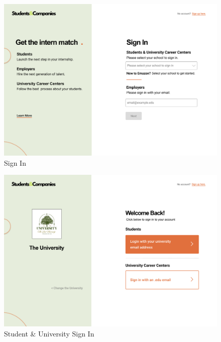 \documentclass{article}
\begin{document}
\begin{figure}[H]
    \centering
    \includegraphics[scale = 0.40]{figures/UserInterfaces/Sign In.png}
    \caption{Sign In}
     \centering
\end{figure}

\begin{figure}[H]
    \centering
    \includegraphics[scale = 0.40]{figures/UserInterfaces/Student Sign In.png}
    \caption{Student \& University Sign In}
     \centering
\end{figure}
    
\end{document}

